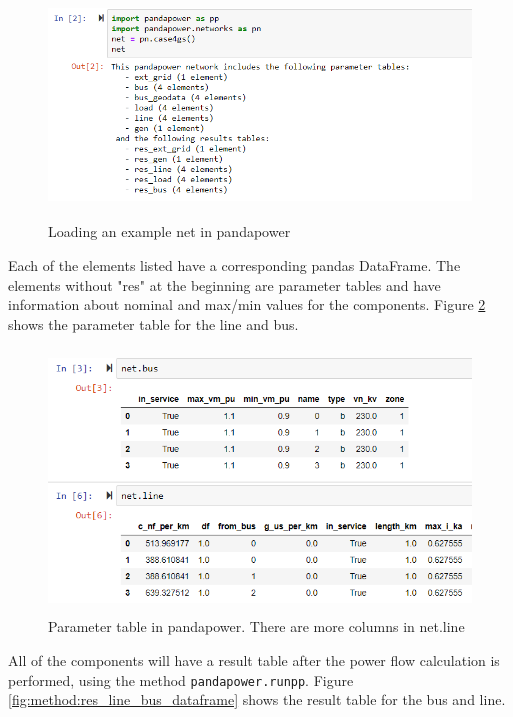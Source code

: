 \documentclass[class=book, crop=false]{standalone}
\begin{document}
\begin{figure}[H]
    \center
    \includegraphics[height=6cm, width=12cm]{figures/case4g_show_net.PNG}
    \caption[size = 9]{Loading an example net in pandapower}
    \label{fig:method:loading_example_net}
\end{figure}
Each of the elements listed have a corresponding pandas DataFrame. The elements without "res" at the beginning are parameter tables and have information about nominal and max/min values for the components. Figure \ref{fig:method:line_bus_dataframe} shows the parameter table for the line and bus.

\begin{figure}[H]
    \includegraphics[height=7cm, width=13.5cm]{figures/case4g_line_bus.PNG}
    \caption[size = 9]{Parameter table in pandapower. There are more columns in net.line}
    \label{fig:method:line_bus_dataframe}
\end{figure}
All of the components will have a result table after the power flow calculation is performed, using the method \texttt{pandapower.runpp}. Figure \ref{fig:method:res_line_bus_dataframe} shows the result table for the bus and line.
\end{document}
